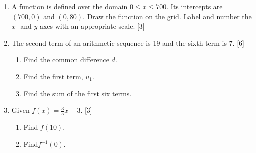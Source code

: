 \documentclass[12pt, twoside]{article}
\begin{document}
\begin{enumerate}
\newpage
\item A function is defined over the domain $0 \leq x \leq 700$. Its intercepts are $(700,0)$ and $(0, 80)$. Draw the function on the grid. Label and number the $x$- and $y$-axes with an appropriate scale. \hfill [3]
  \begin{center}
  \end{center}

  \newpage
  \item The second term of an arithmetic sequence is 19 and the sixth term is 7. \hfill [6]
    \begin{enumerate}[itemsep=3cm]
      \item Find the common difference $d$.
      \item Find the first term, $u_{1}$.
      \item Find the sum of the first six terms.
    \end{enumerate} \vspace{2cm}

  \item Given $f(x)=\frac{3}{5}x-3$.  \hfill [3]
  \begin{enumerate}
    \item Find $f(10)$. \vspace{2cm}
    \item Find$f^{-1}(0)$.
  \end{enumerate} \vspace{4cm}


\end{enumerate}
\end{document}
